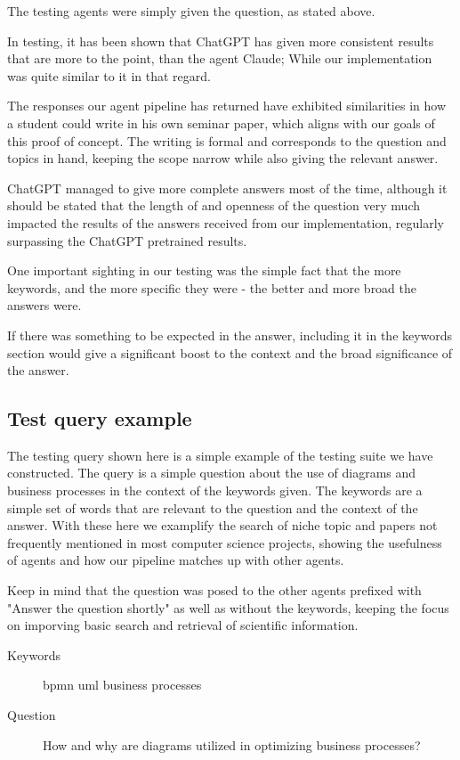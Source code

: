 \documentclass[fleqn,moreauthors,10pt]{ds_report}
\begin{document}
The testing agents were simply given the question, as stated above.

In testing, it has been shown that ChatGPT has given more consistent results that are more to the point, than the agent Claude; While our implementation was quite similar to it in that regard.

The responses our agent pipeline has returned have exhibited similarities in how a student could write in his own seminar paper, which aligns with our goals of this proof of concept.
The writing is formal and corresponds to the question and topics in hand, keeping the scope narrow while also giving the relevant answer.

ChatGPT managed to give more complete answers most of the time, although it should be stated that the length of and openness of the question very much impacted the results of the answers received from our implementation, regularly surpassing the ChatGPT pretrained results.

One important sighting in our testing was the simple fact that the more keywords, and the more specific they were - the better and more broad the answers were.

If there was something to be expected in the answer, including it in the keywords section would give a significant boost to the context and the broad significance of the answer.

\subsection*{Test query example}

The testing query shown here is a simple example of the testing suite we have constructed. The query is a simple question about the use of diagrams and business processes in the context of the keywords given. The keywords are a simple set of words that are relevant to the question and the context of the answer.
With these here we examplify the search of niche topic and papers not frequently mentioned in most computer science projects, showing the usefulness of agents and how our pipeline matches up with other agents.

Keep in mind that the question was posed to the other agents prefixed with "Answer the question shortly" as well as without the keywords, keeping the focus on imporving basic search and retrieval of scientific information.

\begin{description}
	\item[Keywords] bpmn uml business processes
	\item[Question] How and why are diagrams utilized in optimizing business processes?
\end{description}
\end{document}
